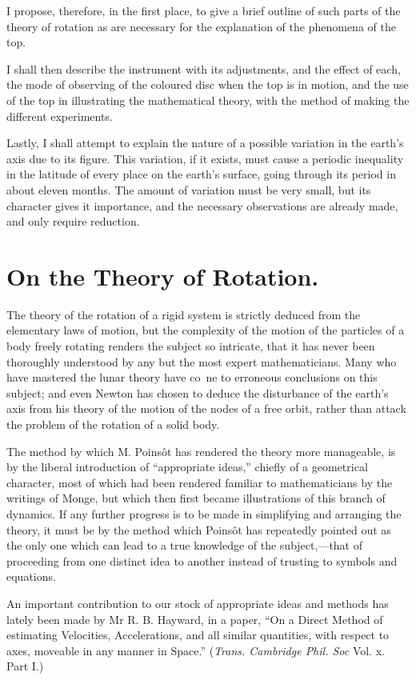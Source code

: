 \documentclass[12pt]{article}
\begin{document}
I propose, therefore, in the first place, to give a brief outline of
such parts of the theory of rotation as are necessary for the
explanation of the phenomena of the top.

I shall then describe the instrument with its adjustments, and the
effect of each, the mode of observing of the coloured disc when the
top is in motion, and the use of the top in illustrating the
mathematical theory, with the method of making the different
experiments.

Lastly, I shall attempt to explain the nature of a possible variation
in the earth's axis due to its figure.  This variation, if it exists,
must cause a periodic inequality in the latitude of every place on the
earth's surface, going through its period in about eleven months.  The
amount of variation must be very small, but its character gives it
importance, and the necessary observations are already made, and only
require reduction.

\section*{On the Theory of Rotation.}

The theory of the rotation of a rigid system is strictly deduced from
the elementary laws of motion, but the complexity of the motion of the
particles of a body freely rotating renders the subject so intricate,
that it has never been thoroughly understood by any but the most
expert mathematicians.  Many who have mastered the lunar theory have
co~ne to erroneous conclusions on this subject; and even Newton has
chosen to deduce the disturbance of the earth's axis from his theory
of the motion of the nodes of a free orbit, rather than attack the
problem of the rotation of a solid body.

The method by which M. Poins\^ot has rendered the theory more
manageable, is by the liberal introduction of ``appropriate ideas,''
chiefly of a geometrical character, most of which had been rendered
familiar to mathematicians by the writings of Monge, but which then
first became illustrations of this branch of dynamics.  If any further
progress is to be made in simplifying and arranging the theory, it
must be by the method which Poins\^ot has repeatedly pointed out as
the only one which can lead to a true knowledge of the subject,---that
of proceeding from one distinct idea to another instead of trusting to
symbols and equations.

An important contribution to our stock of appropriate ideas and
methods has lately been made by Mr R.  B.  Hayward, in a paper, ``On a
Direct Method of estimating Velocities, Accelerations, and all similar
quantities, with respect to axes, moveable in any manner in Space.''
(\emph{Trans. Cambridge Phil. Soc} Vol. x. Part I.)
\end{document}
